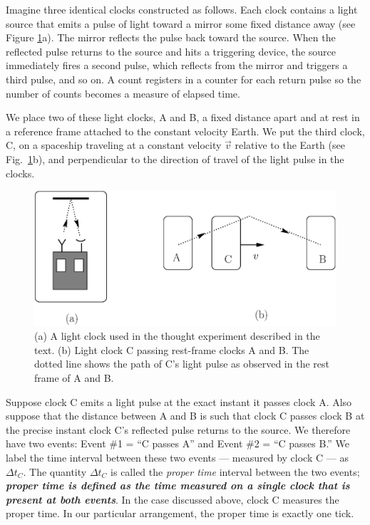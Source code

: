 Imagine three identical clocks constructed as follows.  Each clock
contains a light source that emits a pulse of light toward a mirror
some fixed distance away (see Figure \ref{fig:light-clocks}a).  The
mirror reflects the pulse back toward the source.  When the reflected
pulse returns to the source and hits a triggering device, the source
immediately fires a second pulse, which reflects from the mirror and
triggers a third pulse, and so on.  A count registers in a counter for
each return pulse so the number of counts becomes a measure of elapsed
time.
   
We place two of these light clocks, A and B, a fixed distance apart
and at rest in a reference frame attached to the constant velocity
Earth.  We put the third clock, C, on a spaceship traveling at a
constant velocity $\vec{v}$ relative to the Earth (see
Fig.~\ref{fig:light-clocks}b), and perpendicular to the direction of
travel of the light pulse in the clocks.

\begin{figure}[tbp]
\begin{center}
\includegraphics[width=4.5in]{basic_postulates_of_relativity/rel1_clocks.eps}
\end{center}
\caption{(a) A light clock used in the thought experiment described in
  the text. (b) Light clock C passing rest-frame clocks A and B.  The
  dotted line shows the path of C's light pulse as observed in the
  rest frame of A and B.}
\label{fig:light-clocks}
\end{figure}

Suppose clock C emits a light pulse at the exact instant it passes
clock A.  Also suppose that the distance between A and B is such that
clock C passes clock B at the precise instant clock C's reflected
pulse returns to the source.  We therefore have two events: Event \#1
= ``C passes A'' and Event \#2 = ``C passes B.'' We label the time
interval between these two events --- measured by clock C --- as
$\Delta t_C$.  The quantity $\Delta t_C$ is called the {\em proper
  time} interval between the two events; {\bf {\em proper time is
    defined as the time measured on a single clock that is present at
    both events}}.  In the case discussed above, clock C measures the
proper time.  In our particular arrangement, the proper time is
exactly one tick.
   
